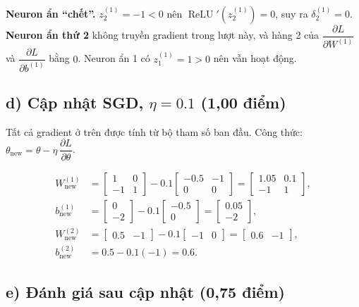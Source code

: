 \documentclass[12pt,a4paper]{article}
\newcommand{\relu}{\operatorname{ReLU}}
\newcommand{\pd}[2]{\dfrac{\partial #1}{\partial #2}}
\begin{document}
\textbf{Neuron ẩn ``chết''.} $z^{(1)}_2=-1<0$ nên $\relu'(z^{(1)}_2)=0$, suy ra $\delta^{(1)}_2=0$. \textbf{Neuron ẩn thứ 2} không truyền gradient trong lượt này, và hàng 2 của $\pd{L}{W^{(1)}}$ và $\pd{L}{b^{(1)}}$ bằng $0$. Neuron ẩn 1 có $z^{(1)}_1=1>0$ nên vẫn hoạt động.

\subsection*{d) Cập nhật SGD, $\eta=0.1$ (1,00 điểm)}

Tất cả gradient ở trên được tính từ bộ tham số ban đầu. Công thức: $\theta_{\text{new}}=\theta-\eta\,\pd{L}{\theta}$.

\begin{align*}
W^{(1)}_{\text{new}}&=\begin{bmatrix}1&0\\-1&1\end{bmatrix}-0.1\begin{bmatrix}-0.5&-1\\0&0\end{bmatrix}
=\begin{bmatrix}1.05&0.1\\-1&1\end{bmatrix},\\[2pt]
b^{(1)}_{\text{new}}&=\begin{bmatrix}0\\-2\end{bmatrix}-0.1\begin{bmatrix}-0.5\\0\end{bmatrix}
=\begin{bmatrix}0.05\\-2\end{bmatrix},\\[2pt]
W^{(2)}_{\text{new}}&=\begin{bmatrix}0.5&-1\end{bmatrix}-0.1\begin{bmatrix}-1&0\end{bmatrix}
=\begin{bmatrix}0.6&-1\end{bmatrix},\\[2pt]
b^{(2)}_{\text{new}}&=0.5-0.1(-1)=0.6.
\end{align*}

\subsection*{e) Đánh giá sau cập nhật (0,75 điểm)}
\end{document}
